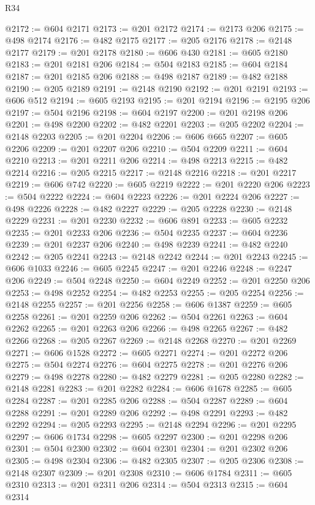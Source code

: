 \begin{lexlean}{R34}
\begin{coremodule}
@2172 := @604 @2171
@2173 := @201 @2172
@2174 := @2173 @206
@2175 := @498 @2174
@2176 := @482 @2175
@2177 := @205 @2176
@2178 := @2148 @2177
@2179 := @201 @2178
@2180 := @606 @430
@2181 := @605 @2180
@2183 := @201 @2181 @206
@2184 := @504 @2183
@2185 := @604 @2184
@2187 := @201 @2185 @206
@2188 := @498 @2187
@2189 := @482 @2188
@2190 := @205 @2189
@2191 := @2148 @2190
@2192 := @201 @2191
@2193 := @606 @512
@2194 := @605 @2193
@2195 := @201 @2194
@2196 := @2195 @206
@2197 := @504 @2196
@2198 := @604 @2197
@2200 := @201 @2198 @206
@2201 := @498 @2200
@2202 := @482 @2201
@2203 := @205 @2202
@2204 := @2148 @2203
@2205 := @201 @2204
@2206 := @606 @665
@2207 := @605 @2206
@2209 := @201 @2207 @206
@2210 := @504 @2209
@2211 := @604 @2210
@2213 := @201 @2211 @206
@2214 := @498 @2213
@2215 := @482 @2214
@2216 := @205 @2215
@2217 := @2148 @2216
@2218 := @201 @2217
@2219 := @606 @742
@2220 := @605 @2219
@2222 := @201 @2220 @206
@2223 := @504 @2222
@2224 := @604 @2223
@2226 := @201 @2224 @206
@2227 := @498 @2226
@2228 := @482 @2227
@2229 := @205 @2228
@2230 := @2148 @2229
@2231 := @201 @2230
@2232 := @606 @891
@2233 := @605 @2232
@2235 := @201 @2233 @206
@2236 := @504 @2235
@2237 := @604 @2236
@2239 := @201 @2237 @206
@2240 := @498 @2239
@2241 := @482 @2240
@2242 := @205 @2241
@2243 := @2148 @2242
@2244 := @201 @2243
@2245 := @606 @1033
@2246 := @605 @2245
@2247 := @201 @2246
@2248 := @2247 @206
@2249 := @504 @2248
@2250 := @604 @2249
@2252 := @201 @2250 @206
@2253 := @498 @2252
@2254 := @482 @2253
@2255 := @205 @2254
@2256 := @2148 @2255
@2257 := @201 @2256
@2258 := @606 @1387
@2259 := @605 @2258
@2261 := @201 @2259 @206
@2262 := @504 @2261
@2263 := @604 @2262
@2265 := @201 @2263 @206
@2266 := @498 @2265
@2267 := @482 @2266
@2268 := @205 @2267
@2269 := @2148 @2268
@2270 := @201 @2269
@2271 := @606 @1528
@2272 := @605 @2271
@2274 := @201 @2272 @206
@2275 := @504 @2274
@2276 := @604 @2275
@2278 := @201 @2276 @206
@2279 := @498 @2278
@2280 := @482 @2279
@2281 := @205 @2280
@2282 := @2148 @2281
@2283 := @201 @2282
@2284 := @606 @1678
@2285 := @605 @2284
@2287 := @201 @2285 @206
@2288 := @504 @2287
@2289 := @604 @2288
@2291 := @201 @2289 @206
@2292 := @498 @2291
@2293 := @482 @2292
@2294 := @205 @2293
@2295 := @2148 @2294
@2296 := @201 @2295
@2297 := @606 @1734
@2298 := @605 @2297
@2300 := @201 @2298 @206
@2301 := @504 @2300
@2302 := @604 @2301
@2304 := @201 @2302 @206
@2305 := @498 @2304
@2306 := @482 @2305
@2307 := @205 @2306
@2308 := @2148 @2307
@2309 := @201 @2308
@2310 := @606 @1784
@2311 := @605 @2310
@2313 := @201 @2311 @206
@2314 := @504 @2313
@2315 := @604 @2314

\end{coremodule}
\end{lexlean}
